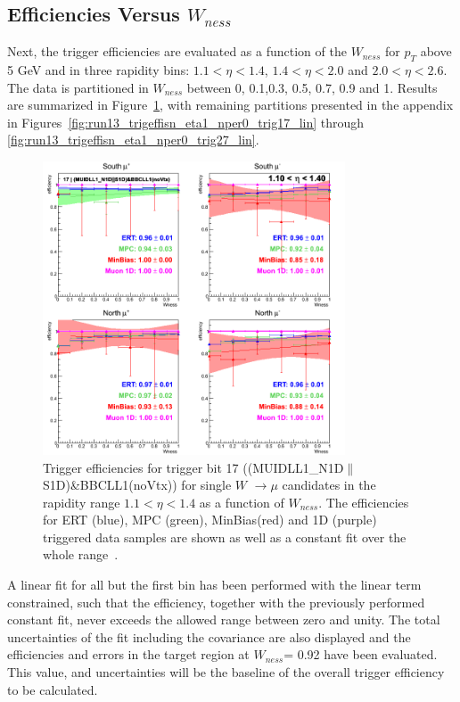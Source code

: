 \clearpage
\subsection{Efficiencies Versus $W_{ness}$}

Next, the trigger efficiencies are evaluated as a function of the $W_{ness}$ for
$p_T$ above 5 GeV and in three rapidity bins: $1.1 < \eta < 1.4$, $1.4 < \eta <
2.0$ and $2.0 < \eta < 2.6$. The data is partitioned in $W_{ness}$ between 0,
0.1,0.3, 0.5, 0.7, 0.9 and 1. Results are summarized in
Figure~\ref{fig:run13_trigeffisn_eta0_nper0_trig17_lin}, with remaining
partitions presented in the appendix in
Figures~\ref{fig:run13_trigeffisn_eta1_nper0_trig17_lin} through
\ref{fig:run13_trigeffisn_eta1_nper0_trig27_lin}.

\begin{figure}[ht]
  \centering
  \includegraphics[width=0.8\textwidth]{./figures/run13_trigeffisn_eta0_trig17_lin.png}
  \caption{
    Trigger efficiencies for trigger bit 17
    ((MUIDLL1\_N1D$\|$S1D)\&BBCLL1(noVtx)) for single $W$ $\rightarrow \mu$
    candidates in the rapidity range $ 1.1 < \eta < 1.4$ as a function of
    $W_{ness}$. The efficiencies for ERT (blue), MPC (green), MinBias(red) and
    1D (purple) triggered data samples are shown as well as a constant fit over
    the whole range~\cite{Seidl2014}.
  }
  \label{fig:run13_trigeffisn_eta0_nper0_trig17_lin} 
\end{figure}

A linear fit for all but the first bin has been performed with the linear term
constrained, such that the efficiency, together with the previously performed
constant fit, never exceeds the allowed range between zero and unity. The total
uncertainties of the fit including the covariance are also displayed and the
efficiencies and errors in the target region at $W_{ness}$= 0.92 have been
evaluated.  This value, and uncertainties will be the baseline of the overall
trigger efficiency to be calculated.


